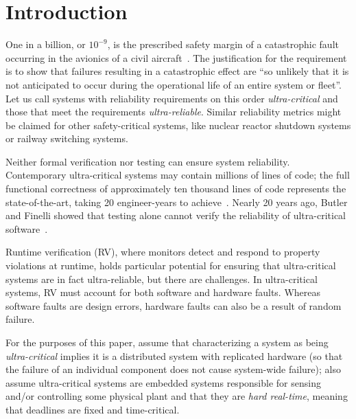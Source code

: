 \section{Introduction}

One in a billion, or $10^{-9}$, is the prescribed safety margin of a
catastrophic fault occurring in the avionics of a civil
aircraft~\cite{Rushby09:SEFM}.  The justification for the requirement
is to show that failures resulting in a catastrophic effect are ``so
unlikely that it is not anticipated to occur during the operational
life of an entire system or fleet''\cite{FAA2000}. Let us call systems
with reliability requirements on this order \emph{ultra-critical} and
those that meet the requirements \emph{ultra-reliable}.  Similar
reliability metrics might be claimed for other safety-critical
systems, like nuclear reactor shutdown systems or railway switching
systems.

Neither formal verification nor testing can ensure system reliability.
Contemporary ultra-critical systems may contain millions of lines of code; the
full functional correctness of approximately ten thousand lines of code
represents the state-of-the-art, taking 20 engineer-years to achieve~\cite{l4}.
Nearly 20 years ago, Butler and Finelli showed that testing alone cannot verify
the reliability of ultra-critical software~\cite{butler}.

Runtime verification (RV), where monitors detect and respond to property
violations at runtime, holds particular potential for ensuring that
ultra-critical systems are in fact ultra-reliable, but there are challenges.  In
ultra-critical systems, RV must account for both software and hardware faults.
Whereas software faults are design errors, hardware faults can also be a result of
random failure.  

For the purposes of this paper, assume that characterizing a system as
being \emph{ultra-critical} implies it is a distributed system with replicated
hardware (so that the failure of an individual component does not cause system-wide
failure); also assume ultra-critical systems are embedded systems
responsible for 
sensing and/or controlling some physical plant and that they are \emph{hard
  real-time}, meaning that deadlines are fixed and time-critical.  %



